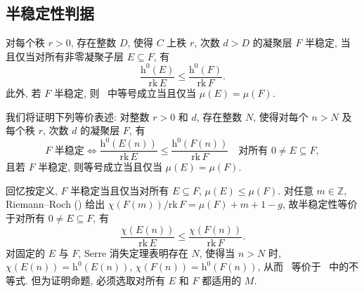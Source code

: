 \subsection{半稳定性判据}\label{src:9.5.2-subsection}
\begin{proposition}[半稳定性判据]\label{src:9.5.5}
对每个秩 $r>0$, 存在整数 $D$, 使得 $C$ 上秩 $r$, 次数 $d>D$ 的凝聚层 $F$ 半稳定, 当且仅当对所有非零凝聚子层 $E\subseteq F$, 有
\begin{equation}\label{src:9.5.6}
\frac{\mathrm h^0(E)}{\mathrm{rk}\,E}\leq\frac{\mathrm h^0(F)}{\mathrm{rk}\,F}.
\end{equation}
此外, 若 $F$ 半稳定, 则~ 中等号成立当且仅当 $\mu(E)=\mu(F)$.
\end{proposition}
我们将证明下列等价表述: 对整数 $r>0$ 和 $d$, 存在整数 $N$, 使得对每个 $n>N$ 及每个秩 $r$, 次数 $d$ 的凝聚层 $F$, 有
\begin{equation}\label{src:9.5.7}
F\text{ 半稳定}\iff\frac{\mathrm h^0(E(n))}{\mathrm{rk}\,E}\leq\frac{\mathrm h^0(F(n))}{\mathrm{rk}\,F}\quad\text{对所有 }0\neq E\subseteq F,
\end{equation}
且若 $F$ 半稳定, 则等号成立当且仅当 $\mu(E)=\mu(F)$.

回忆按定义, $F$ 半稳定当且仅当对所有 $E\subseteq F$, $\mu(E)\leq\mu(F)$. 对任意 $m\in\mathbb Z$, Riemann--Roch () 给出 $\chi(F(m))/\mathrm{rk}\,F=\mu(F)+m+1-g$, 故半稳定性等价于对所有 $0\neq E\subseteq F$, 有
\begin{equation}\label{src:9.5.8}
\frac{\chi(E(n))}{\mathrm{rk}\,E}\leq\frac{\chi(F(n))}{\mathrm{rk}\,F}.
\end{equation}
对固定的 $E$ 与 $F$, Serre 消失定理表明存在 $N$, 使得当 $n>N$ 时, $\chi(E(n))=\mathrm h^0(E(n))$, $\chi(F(n))=\mathrm h^0(F(n))$, 从而~ 等价于~ 中的不等式. 但为证明命题, 必须选取对所有 $E$ 和 $F$ 都适用的 $M$.

